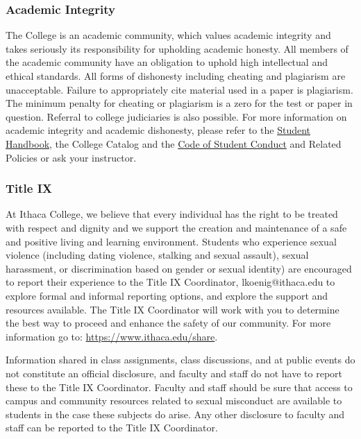 \documentclass[
  letterpaper,
  DIV=11,
  numbers=noendperiod]{scrartcl}
\begin{document}
\subsubsection{Academic Integrity}\label{academic-integrity}

The College is an academic community, which values academic integrity
and takes seriously its responsibility for upholding academic honesty.
All members of the academic community have an obligation to uphold high
intellectual and ethical standards. All forms of dishonesty including
cheating and plagiarism are unacceptable. Failure to appropriately cite
material used in a paper is plagiarism. The minimum penalty for cheating
or plagiarism is a zero for the test or paper in question. Referral to
college judiciaries is also possible. For more information on academic
integrity and academic dishonesty, please refer to the
\href{https://www.ithaca.edu/student-affairs-and-campus-life/student-handbook}{Student
Handbook}, the College Catalog and the
\href{https://www.ithaca.edu/policy-manual/volume-vii-students/71-general-student-policies/712-student-conduct-code}{Code
of Student Conduct} and Related Policies or ask your instructor.

\subsubsection{Title IX}\label{title-ix}

At Ithaca College, we believe that every individual has the right to be
treated with respect and dignity and we support the creation and
maintenance of a safe and positive living and learning environment.
Students who experience sexual violence (including dating violence,
stalking and sexual assault), sexual harassment, or discrimination based
on gender or sexual identity) are encouraged to report their experience
to the Title IX Coordinator, lkoenig@ithaca.edu to explore formal and
informal reporting options, and explore the support and resources
available. The Title IX Coordinator will work with you to determine the
best way to proceed and enhance the safety of our community. For more
information go to: \url{https://www.ithaca.edu/share}.

Information shared in class assignments, class discussions, and at
public events do not constitute an official disclosure, and faculty and
staff do not have to report these to the Title IX Coordinator. Faculty
and staff should be sure that access to campus and community resources
related to sexual misconduct are available to students in the case these
subjects do arise. Any other disclosure to faculty and staff can be
reported to the Title IX Coordinator.
\end{document}
